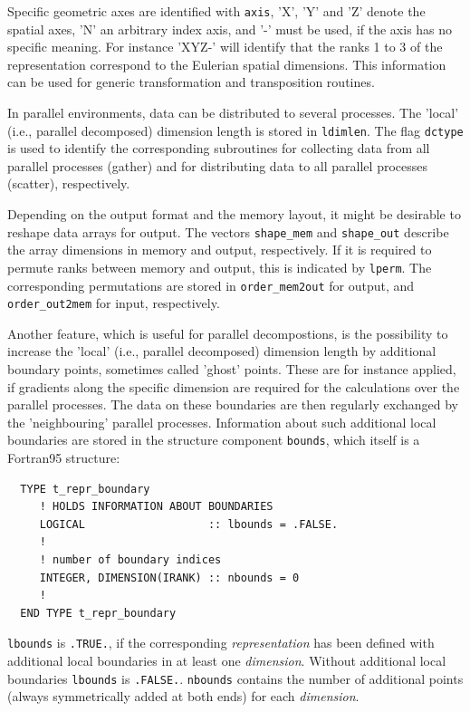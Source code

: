\documentclass[twoside]{article}
\begin{document}
Specific geometric axes are identified with {\tt axis}, 'X', 'Y' and 'Z'
denote the spatial axes, 'N' an arbitrary index axis, and '{-}' must be
used, if the axis has no specific meaning. For instance
'XYZ{-}' will identify that the ranks 1 to 3 of the representation
correspond to the Eulerian spatial dimensions. This information can be used
for generic transformation and transposition routines.

In parallel environments, data can be distributed to several processes.
The 'local' (i.e., parallel decomposed) dimension length is stored in
{\tt ldimlen}. The flag {\tt dctype} is used to identify the corresponding
subroutines for collecting data from all parallel processes (gather) and for
distributing data to all parallel processes (scatter), respectively.

Depending on the output format and the memory layout, it might be desirable
to reshape data arrays for output. The vectors {\tt shape\_mem} and
{\tt shape\_out} describe the array dimensions in memory and output,
respectively. If it is required to permute ranks between memory and output,
this is indicated by {\tt lperm}. The corresponding permutations are stored
in {\tt order\_mem2out} for output, and {\tt order\_out2mem} for input,
respectively.

Another feature, which is useful for parallel decompostions, is the
possibility to increase the 'local' (i.e., parallel decomposed) dimension
length by additional boundary points, sometimes called 'ghost' points.
These are for instance applied, if gradients along the specific dimension
are required for the calculations over the parallel processes. The data on
these boundaries are then regularly exchanged by the 'neighbouring' parallel
processes. Information about such additional local boundaries are stored
in the structure component {\tt bounds}, which itself is a Fortran95 structure:

\begin{verbatim}
  TYPE t_repr_boundary
     ! HOLDS INFORMATION ABOUT BOUNDARIES
     LOGICAL                   :: lbounds = .FALSE.
     !
     ! number of boundary indices
     INTEGER, DIMENSION(IRANK) :: nbounds = 0
     !
  END TYPE t_repr_boundary
\end{verbatim}

{\tt lbounds} is {\tt .TRUE.}, if the corresponding {\it representation} has
been defined with additional local boundaries in at least one {\it dimension}.
Without additional local boundaries {\tt lbounds} is {\tt .FALSE.}.
{\tt nbounds} contains the number of additional points
(always symmetrically added at both ends) for each {\it dimension}.
\end{document}
